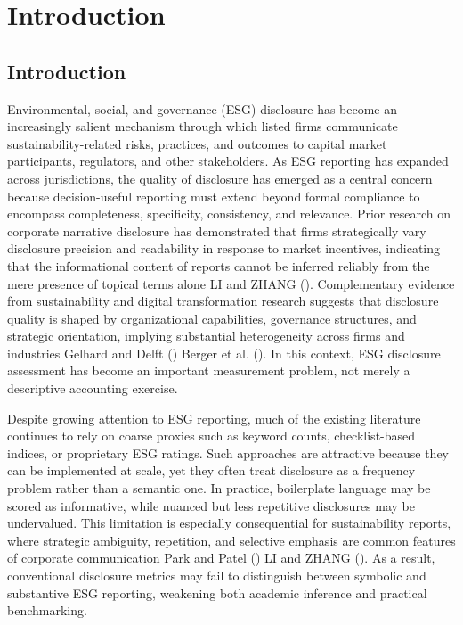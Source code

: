 \documentclass[
  12pt,
]{article}
\begin{document}
\section{Introduction}\label{introduction}

\subsection{Introduction}\label{introduction-1}

Environmental, social, and governance (ESG) disclosure has become an
increasingly salient mechanism through which listed firms communicate
sustainability-related risks, practices, and outcomes to capital market
participants, regulators, and other stakeholders. As ESG reporting has
expanded across jurisdictions, the quality of disclosure has emerged as
a central concern because decision-useful reporting must extend beyond
formal compliance to encompass completeness, specificity, consistency,
and relevance. Prior research on corporate narrative disclosure has
demonstrated that firms strategically vary disclosure precision and
readability in response to market incentives, indicating that the
informational content of reports cannot be inferred reliably from the
mere presence of topical terms alone LI and ZHANG
(). Complementary evidence from
sustainability and digital transformation research suggests that
disclosure quality is shaped by organizational capabilities, governance
structures, and strategic orientation, implying substantial
heterogeneity across firms and industries Gelhard and Delft
() Berger et al.
(). In this context, ESG disclosure
assessment has become an important measurement problem, not merely a
descriptive accounting exercise.

Despite growing attention to ESG reporting, much of the existing
literature continues to rely on coarse proxies such as keyword counts,
checklist-based indices, or proprietary ESG ratings. Such approaches are
attractive because they can be implemented at scale, yet they often
treat disclosure as a frequency problem rather than a semantic one. In
practice, boilerplate language may be scored as informative, while
nuanced but less repetitive disclosures may be undervalued. This
limitation is especially consequential for sustainability reports, where
strategic ambiguity, repetition, and selective emphasis are common
features of corporate communication Park and Patel
() LI and ZHANG
(). As a result, conventional disclosure
metrics may fail to distinguish between symbolic and substantive ESG
reporting, weakening both academic inference and practical benchmarking.
\end{document}
